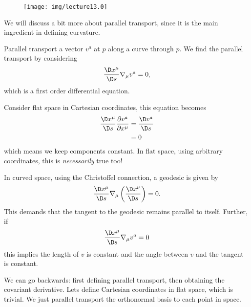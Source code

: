 
\begin{wrapfigure}{r}{6pc}
  \vspace{-1pc}
  \texttt{[image: img/lecture13.0]}
  \vspace{-2pc}
\end{wrapfigure}
We will discuss a bit more about parallel transport, since it is
the main ingredient in defining curvature. 

Parallel transport a vector $v^{a}$ at $p$ along a curve through
$p$. We find the parallel transport by considering
\begin{equation}
\frac{\D x^{\mu}}{\D s}\nabla_{\mu}v^{a}=0,
\end{equation}
which is a first order differential equation.

Consider flat space in Cartesian coordinates, this equation
becomes
\begin{equation}
\begin{split}
\frac{\D x^{\mu}}{\D s}\frac{\partial v^{a}}{\partial x^{\mu}}
&=\frac{\D v^{a}}{\D s}\\
&=0
\end{split}
\end{equation}
which means we keep components constant. In flat space, using
arbitrary coordinates, this is \emph{necessarily} true too!

In curved space, using the Christoffel connection, a geodesic is
given by
\begin{equation}
\frac{\D x^{\mu}}{\D s}\nabla_{\mu}
\left(\frac{\D x^{\nu}}{\D s}
\right)=0.
\end{equation}
This demands that the tangent to the geodesic remains parallel to
itself. Further, if
\begin{equation}
\frac{\D x^{\mu}}{\D s}\nabla_{\mu}v^{a}=0
\end{equation}
this implies the length of $v$ is constant and the angle between
$v$ and the tangent is constant.

We can go backwards: first defining parallel transport, then
obtaining the covariant derivative. Lets define Cartesian
coordinates in flat space, which is trivial. We just parallel
transport the orthonormal basis to each point in space.

